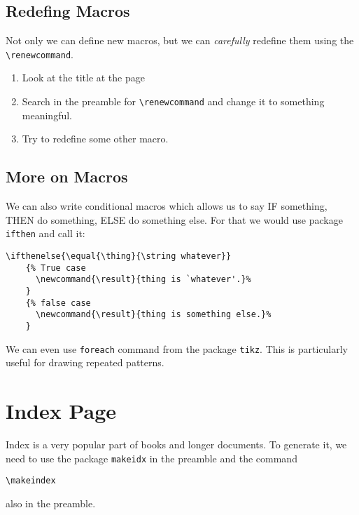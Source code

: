 \documentclass[a4paper,10pt]{report} %
\begin{document}
\subsection{Redefing Macros}
Not only we can define new macros, but we can \emph{carefully} redefine them using the \texttt{\textbackslash renewcommand}.\\

\begin{enumerate}
 \item Look at the title at the page \pageref{contents}
 \item Search in the preamble for \texttt{\textbackslash renewcommand} and change it to something meaningful.
 \item Try to redefine some other macro. 
\end{enumerate}


\subsection{More on Macros} 
 We can also write  conditional macros which allows us to say IF something, THEN do something, ELSE do something else. For that we would use package \texttt{ifthen} and call it:
 

\begin{lstlisting}[language={[latex]tex},
    frame=single,basicstyle=\footnotesize,showstringspaces=false, 
     keywordstyle=\color{magenta}, stringstyle=\color{brown}, commentstyle=\color{ForestGreen}]
    \ifthenelse{\equal{\thing}{\string whatever}}
    {% True case
      \newcommand{\result}{thing is `whatever'.}%
    }
    {% false case
      \newcommand{\result}{thing is something else.}%
    }
 \end{lstlisting}
 
 We can even use \texttt{foreach} command from the package \texttt{tikz}. This is particularly useful for drawing repeated patterns.
 
\section{Index Page}
Index  is a very popular part of books and longer documents.
To generate it, we need to use the package \texttt{makeidx} in the preamble and the command 
\begin{lstlisting}[language={[latex]tex},
    frame=single,basicstyle=\footnotesize]
     \makeindex
\end{lstlisting}
also in the preamble.\\
\end{document}
